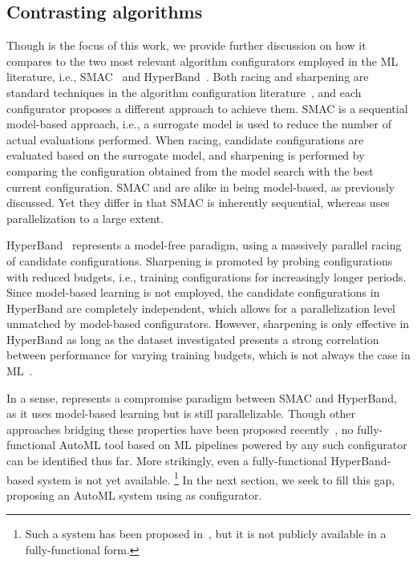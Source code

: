\subsection{Contrasting algorithms}
Though \irace is the focus of this work, we provide further discussion on how it compares to the two most relevant algorithm configurators employed in the ML literature, i.e., SMAC~\cite{smac} and HyperBand~\cite{li2017hyperband}. Both racing and sharpening are standard techniques in the algorithm configuration literature~\cite{BezLopStu2020}, and each configurator proposes a different approach to achieve them. SMAC is a sequential model-based approach, i.e., a surrogate model is used to reduce the number of actual evaluations performed. When racing, candidate configurations are evaluated based on the surrogate model, and sharpening is performed by comparing the configuration obtained from the model search with the best current configuration. SMAC and \irace are alike in being model-based, as previously discussed. Yet they differ in that SMAC is inherently sequential, whereas \irace uses parallelization to a large extent.

HyperBand~\cite{li2017hyperband} represents a model-free paradigm, using a massively parallel racing of candidate configurations. Sharpening is promoted by probing configurations with reduced budgets, i.e., training configurations for increasingly longer periods. Since model-based learning is not employed, the candidate configurations in HyperBand are completely independent, which allows for a parallelization level unmatched by model-based configurators. However, sharpening is only effective in HyperBand as long as the dataset investigated presents a strong correlation between performance for varying training budgets, which is not always the case in ML~\cite{ying2019nasbench}.

In a sense, \irace represents a compromise paradigm between SMAC and HyperBand, as it uses model-based learning but is still parallelizable. Though other approaches bridging these properties have been proposed recently~\cite{falkner2018bohb}, no fully-functional AutoML tool based on ML pipelines powered by any such configurator can be identified thus far. More strikingly, even a fully-functional HyperBand-based system is not yet available.%
\footnote{Such a system has been proposed in~\cite{autoband}, but it is not publicly available in a fully-functional form.}
In the next section, we seek to fill this gap, proposing an AutoML system using \irace as configurator.